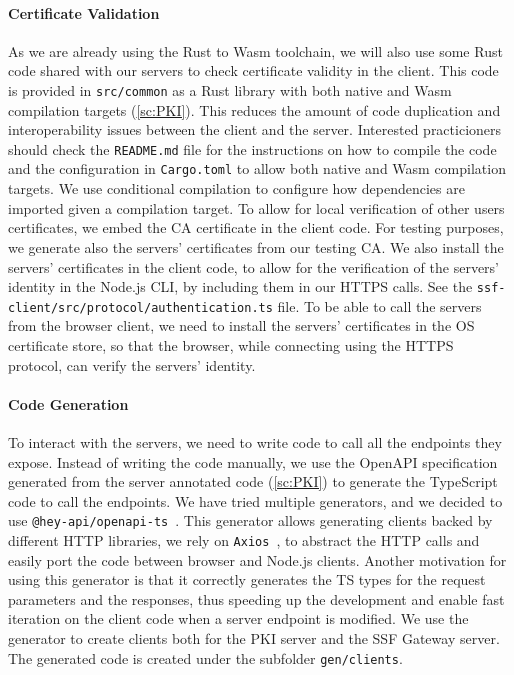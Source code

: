 \paragraph{Certificate Validation}
As we are already using the Rust to Wasm toolchain, 
we will also use some Rust code shared
with our servers to check certificate validity in the client.
This code is provided in \texttt{src/common} as a Rust library
with both native and Wasm compilation targets (\cref{sc:PKI}).
This reduces the amount of code duplication and interoperability
issues between the client and the server. Interested practicioners
should check the \texttt{README.md} file for the
instructions on how to compile the code and the configuration
in \texttt{Cargo.toml} to allow both native and Wasm compilation
targets. We use conditional
compilation to configure how dependencies are imported
given a compilation target. To allow for local verification
of other users certificates,
we embed the CA certificate in the client code.
For testing purposes, we generate also the servers' certificates
from our testing CA.
We also install the servers' certificates in the client code,
to allow for the verification of the servers' identity
in the Node.js CLI, by including them in our HTTPS calls.
See the \texttt{ssf-client/src/protocol/authentication.ts} file.
To be able to call the servers from the browser client,
we need to install the servers' certificates in the OS
certificate store, so that the browser, while connecting 
using the HTTPS protocol, can verify the servers' identity.

\paragraph{Code Generation}
To interact with the servers, we need to write code to
call all the endpoints they expose.
Instead of writing the code manually, we use the OpenAPI
specification generated from the server annotated code (\cref{sc:PKI})
to generate the TypeScript code to call the endpoints.
We have tried multiple generators, and we
decided to use \texttt{@hey-api/openapi-ts}~\cite{OpenAPITs}.
This generator allows generating clients backed by
different HTTP libraries, we rely on \texttt{Axios}~\cite{OpenAPIAxios}, 
to abstract the HTTP calls and easily port the code
between browser and Node.js clients.
Another motivation for using this generator is that it
correctly generates the TS types for the request parameters
and the responses, thus speeding up the development
and enable fast iteration on the client code when a server
endpoint is modified.
We use the generator to create clients both for the PKI server and the SSF Gateway server.
The generated code is created under the subfolder \texttt{gen/clients}.


